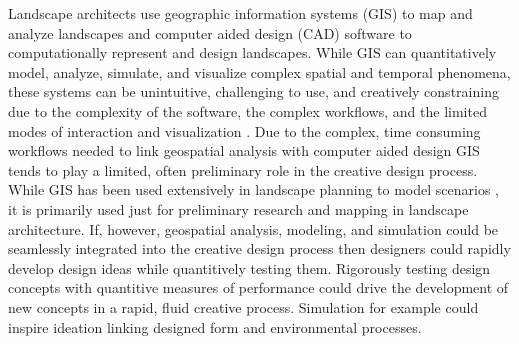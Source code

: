 \documentclass[Afour,sageh,times]{sagej}
\begin{document}
Landscape architects use 
geographic information systems (GIS) to map and analyze landscapes
and computer aided design (CAD) software %
to computationally represent and design landscapes.
%
While GIS can quantitatively model, analyze, simulate, and visualize 
complex spatial and temporal phenomena,
these systems can be unintuitive, challenging to use, and creatively constraining
due to the complexity of the software, 
the complex workflows, 
and the limited modes of interaction and visualization 
\cite{Ratti2004}. 
%
Due to the complex, time consuming workflows 
needed to link geospatial analysis with computer aided design 
GIS tends to play a limited, often preliminary role in the creative design process.
%
While GIS has been used extensively in landscape planning 
to model scenarios \cite{Steinitz2004,Baker2004,Steinitz2012},
it is primarily used just for preliminary research and mapping
in landscape architecture.
%
If, however, geospatial analysis, modeling, and simulation
could be seamlessly integrated into the creative design process 
then designers could rapidly develop design ideas
while quantitively testing them. 
%
Rigorously testing design concepts with quantitive measures of performance 
could drive the development of new concepts 
in a rapid, fluid creative process.
Simulation for example could inspire ideation 
linking designed form and environmental processes. 
















\end{document}
